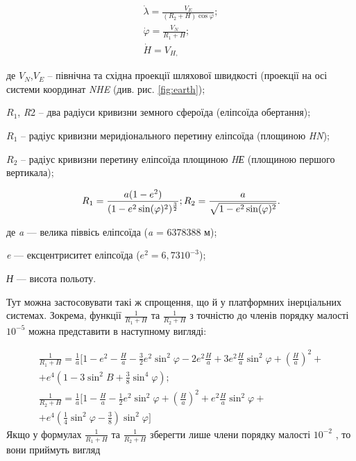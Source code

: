\[\begin{array}{l} 
{\dot{\lambda}=\frac{V_{E} }{(R_{2} +H)\cos \varphi} ;} \\ 
{\dot{\varphi}=\frac{V_{N} }{R_{1} +H} ;} \\ 
{\dot{H}=V_{H,} } 
\end{array}\] 
\begin{ESKDexplanation}
\item де  $V_{N}$,$V_{E}$ -- північна та східна проекції шляхової швидкості 
(проекції на осі  системи координат \textit{NHE}  (див. рис. \ref{fig:earth}); 
\item $R_1$, \textit{R}2 -- два радіуси кривизни земного сфероїда (еліпсоїда обертання); 
\item $R_1$ -- радіус кривизни меридіонального перетину еліпсоїда (площиною \textit{HN}); 
\item $R_2$  -- радіус кривизни перетину еліпсоїда площиною \textit{HЕ} (площиною першого вертикала); 
\end{ESKDexplanation}
\[R_{1} =\frac{a(1-e^{2})}{(1-e^{2} \sin(\varphi)^{2})^{\frac{3}{2}} };\\
R_{2} =\frac{a}{\sqrt{1-e^{2} \sin(\varphi)^{2} } }.\] 
\begin{ESKDexplanation}
\item де\textit{ a}  --- велика піввісь  еліпсоїда (\textit{a }=  6378388 м); 
\item \textit{e} --- ексцентриситет еліпсоїда  ($e^{2} = 6,73 10^{-3}$);  
\item \textit{Н}  --- висота польоту. 
\end{ESKDexplanation}
Тут можна застосовувати такі ж спрощення, що й у платформних інерціальних системах. 
Зокрема, функції   $\frac{1}{R_{1} +H}$ та $\frac{1}{R_{2} +H} $ 
з точністю до членів порядку малості $10^{-5}$ можна представити 
в наступному вигляді:

\[\begin{array}{l} 
{\frac{1}{R_{1} +H} =\frac{1}{a} [1-e^{2} -\frac{H}{a} 
-\frac{3}{2} e^{2} \sin ^{2} \varphi-2e^{2} \frac{H}{a} +3e^{2} \frac{H}{a} \sin 
^{2} \varphi + (\frac{H}{a} )^{2} +}\\
{+e^{4} (1-3\sin ^{2} B+\frac{3}{8}\sin ^{4} \varphi);} \\ 

{\frac{1}{R_{2} +H} =\frac{1}{a}[1-\frac{H}{a} 
-\frac{1}{2} e^{2} \sin ^{2} \varphi+(\frac{H}{a})^{2} +e^{2} \frac{H}{a} 
\sin ^{2} \varphi+} \\ 
{+e^{4}(\frac{1}{4} \sin ^{2} \varphi-\frac{3}{8})\sin ^{2} \varphi]} 
\end{array}\] 
Якщо у формулах $\frac{1}{R_{1} +H}$ та $\frac{1}{R_{2} +H}$ 
зберегти лише члени порядку малості $10^{-2}$ , то вони приймуть 
вигляд

